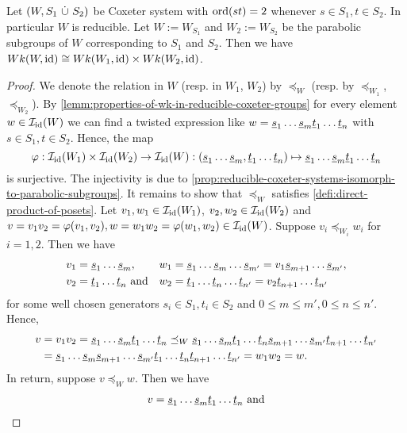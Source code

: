 \begin{coro}
	Let $(W,S_1 \ \dot \cup \  S_2)$ be Coxeter system with $\operatorname{ord}(st) = 2$ whenever $s \in S_1, t \in S_2$. In particular $W$ is reducible. Let $W := W_{S_1}$ and $W_2 := W_{S_2}$ be the parabolic subgroups of $W$ corresponding to $S_1$ and $S_2$. Then we have $Wk(W,\operatorname{id}) \cong Wk(W_1,\operatorname{id}) \times Wk(W_2,\operatorname{id})$.

	\begin{proof}
		We denote the relation in $W$ (resp. in $W_1$, $W_2$) by $\preceq_W$ (resp. by $\preceq_{W_1}$, $\preceq_{W_2}$). By \ref{lemm:properties-of-wk-in-reducible-coxeter-groups} for every element $w \in \mathcal{I}_{\operatorname{id}}(W)$ we can find a twisted expression like $w = \underline{s}_1 \ldots \underline{s}_m \underline{t}_1 \ldots \underline{t}_n$ with $s \in S_1, t \in S_2$. Hence, the map
		$$ \varphi : \mathcal{I}_{\operatorname{id}}(W_1) \times \mathcal{I}_{\operatorname{id}}(W_2) \to \mathcal{I}_{\operatorname{id}}(W) : (\underline{s}_1 \ldots \underline{s}_m, \underline{t}_1 \ldots \underline{t}_n) \mapsto \underline{s}_1 \ldots \underline{s}_m \underline{t}_1 \ldots \underline{t}_n $$
		is surjective. The injectivity is due to \ref{prop:reducible-coxeter-systems-isomorph-to-parabolic-subgroups}. It remains to show that $\preceq_W$ satisfies \ref{defi:direct-product-of-posets}. Let $v_1,w_1 \in \mathcal{I}_{\operatorname{id}}(W_1)$, $v_2,w_2 \in \mathcal{I}_{\operatorname{id}}(W_2)$ and $v = v_1v_2 = \varphi(v_1,v_2), w = w_1w_2 = \varphi(w_1,w_2) \in \mathcal{I}_{\operatorname{id}}(W)$. Suppose $v_i \preceq_{W_i} w_i$ for $i=1,2$. Then we have
		\begin{align*}
			v_1	& = \underline{s}_1 \ldots \underline{s}_m, &
			w_1	& = \underline{s}_1 \ldots \underline{s}_m \ldots \underline{s}_{m'} = v_1 \underline{s}_{m+1} \ldots \underline{s}_{m'}, \\
			v_2	& = \underline{t}_1 \ldots \underline{t}_n \textrm{ and} &
			w_2	& = \underline{t}_1 \ldots \underline{t}_n \ldots \underline{t}_{n'} = v_2 \underline{t}_{n+1} \ldots \underline{t}_{n'}
		\end{align*}
		for some well chosen generators $s_i \in S_1, t_i \in S_2$ and $0 \leq m \leq m', 0 \leq n \leq n'$. Hence,
		\begin{align*}
			v	& = v_1 v_2 = \underline{s}_1 \ldots \underline{s}_m \underline{t}_1 \ldots \underline{t}_n \preceq_W \underline{s}_1 \ldots \underline{s}_m \underline{t}_1 \ldots \underline{t}_n \underline{s}_{m+1} \ldots \underline{s}_{m'} \underline{t}_{n+1} \ldots \underline{t}_{n'} \\
				& = \underline{s}_1 \ldots \underline{s}_m \underline{s}_{m+1} \ldots \underline{s}_{m'} \underline{t}_1 \ldots \underline{t}_n  \underline{t}_{n+1} \ldots \underline{t}_{n'} = w_1 w_2 = w.
		\end{align*}
		In return, suppose $v \preceq_W w$. Then we have
		\begin{align*}
			v	& = \ul s_1 \ldots \ul s_m \ul t_1 \ldots \ul t_n \textrm{ and} \\

\end{align*}
\end{proof}
\end{coro}
